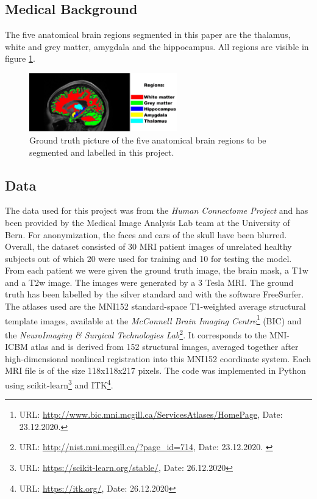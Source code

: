 \documentclass[article]{IEEEtran}
\begin{document}
\subsection{Medical Background}
	The five anatomical brain regions segmented in this paper are the thalamus, white and grey matter, amygdala and the hippocampus. All regions are visible in figure \ref{fig:e1}.

	\begin{figure}[h]
		\centering
		\includegraphics[width=0.57\textwidth]{brainRegions}
		\caption{Ground truth picture of the five anatomical brain regions to be segmented and labelled in this project.}
		\label{fig:e1}
	\end{figure}

\subsection{Data}
	The data used for this project was from the {\itshape Human Connectome Project} and has been provided by the Medical Image Analysis Lab team at the University of Bern. For anonymization, the faces and ears of the skull have been blurred. 
	Overall, the dataset consisted of 30 MRI patient images of unrelated healthy subjects out of which 20 were used for training and 10 for testing the model. 
	From each patient we were given the ground truth image, the brain mask, a T1w and a T2w image. The images were generated by a 3 Tesla MRI. 
	The ground truth has been labelled by the silver standard and with the software FreeSurfer.
	The atlases used are the MNI152 standard-space T1-weighted average structural template images, available at the {\itshape McConnell Brain Imaging Centre}\footnote{URL: \url{http://www.bic.mni.mcgill.ca/ServicesAtlases/HomePage}, Date: 23.12.2020.} (BIC) and the {\itshape NeuroImaging \& Surgical Technologies Lab}\footnote{URL: \url{http://nist.mni.mcgill.ca/?page_id=714}, Date: 23.12.2020. \label{second}}. 
	It corresponds to the MNI-ICBM atlas and is derived from 152 structural images, averaged together after high-dimensional nonlineal registration into this MNI152 coordinate system.
	Each MRI file is of the size 118x118x217 pixels.\smallskip
	The code was implemented in Python using scikit-learn\footnote{URL: \url{https://scikit-learn.org/stable/}, Date: 26.12.2020} and ITK\footnote{URL: \url{https://itk.org/}, Date: 26.12.2020}.
		
\end{document}
